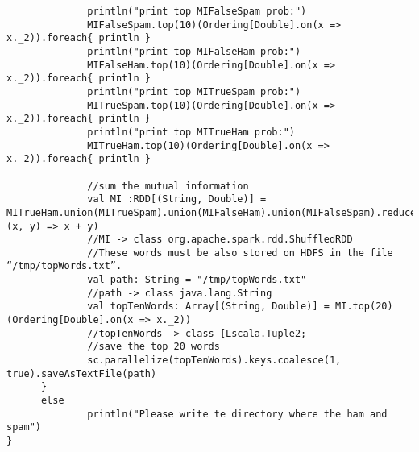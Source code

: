 \documentclass[paper=a4, fontsize=11pt]{scrartcl}
\numberwithin{equation}{section}		%
\numberwithin{figure}{section}			%
\numberwithin{table}{section}				%
\begin{document}
\begin{lstlisting}
              println("print top MIFalseSpam prob:")
              MIFalseSpam.top(10)(Ordering[Double].on(x => x._2)).foreach{ println }
              println("print top MIFalseHam prob:")
              MIFalseHam.top(10)(Ordering[Double].on(x => x._2)).foreach{ println }
              println("print top MITrueSpam prob:")
              MITrueSpam.top(10)(Ordering[Double].on(x => x._2)).foreach{ println }
              println("print top MITrueHam prob:")
              MITrueHam.top(10)(Ordering[Double].on(x => x._2)).foreach{ println }

              //sum the mutual information
              val MI :RDD[(String, Double)] = MITrueHam.union(MITrueSpam).union(MIFalseHam).union(MIFalseSpam).reduceByKey( (x, y) => x + y)
              //MI -> class org.apache.spark.rdd.ShuffledRDD
              //These words must be also stored on HDFS in the file “/tmp/topWords.txt”.
              val path: String = "/tmp/topWords.txt"
              //path -> class java.lang.String
              val topTenWords: Array[(String, Double)] = MI.top(20)(Ordering[Double].on(x => x._2))
              //topTenWords -> class [Lscala.Tuple2;
              //save the top 20 words
              sc.parallelize(topTenWords).keys.coalesce(1, true).saveAsTextFile(path)
      }
      else
              println("Please write te directory where the ham and spam")
}

\end{lstlisting}
\end{document}

